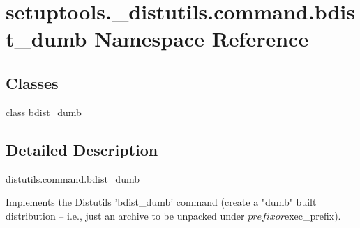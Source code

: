 \hypertarget{namespacesetuptools_1_1__distutils_1_1command_1_1bdist__dumb}{}\section{setuptools.\+\_\+distutils.\+command.\+bdist\+\_\+dumb Namespace Reference}
\label{namespacesetuptools_1_1__distutils_1_1command_1_1bdist__dumb}
\subsection*{Classes}
\begin{DoxyCompactItemize}
\item 
class \hyperlink{classsetuptools_1_1__distutils_1_1command_1_1bdist__dumb_1_1bdist__dumb}{bdist\+\_\+dumb}
\end{DoxyCompactItemize}


\subsection{Detailed Description}
\begin{DoxyVerb}distutils.command.bdist_dumb

Implements the Distutils 'bdist_dumb' command (create a "dumb" built
distribution -- i.e., just an archive to be unpacked under $prefix or
$exec_prefix).\end{DoxyVerb}
 